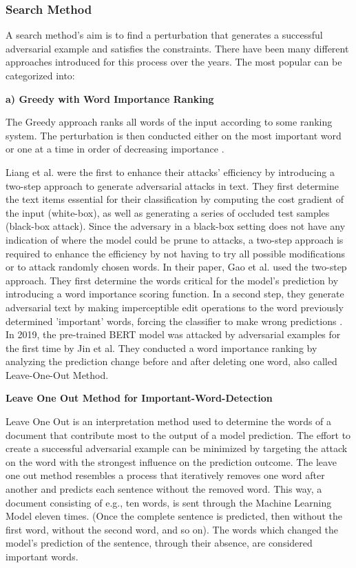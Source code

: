 \subsubsection{Search Method}
\label{sec:search_method}

A search method's aim is to find a perturbation that generates a successful adversarial example and satisfies the constraints. There have been many different approaches introduced for this process over the years. The most popular can be categorized into:

    \textbf{a) Greedy with Word Importance Ranking}
    
        The Greedy approach ranks all words of the input according to some ranking system. The perturbation is then conducted either on the most important word or one at a time in order of decreasing importance \cite{li2018textbugger, jin2019bert, garg2020bae}.
    
        Liang et al. were the first to enhance their attacks' efficiency by introducing a two-step approach to generate adversarial attacks in text. They first determine the text items essential for their classification by computing the cost gradient of the input (white-box), as well as generating a series of occluded test samples (black-box attack)\cite{liang2017deep}. 
        Since the adversary in a black-box setting does not have any indication of where the model could be prune to attacks, a two-step approach is required to enhance the efficiency by not having to try all possible modifications or to attack randomly chosen words. 
        In their paper, Gao et al. used the two-step approach. They first determine the words critical for the model's prediction by introducing a word importance scoring function. In a second step, they generate adversarial text by making imperceptible edit operations to the word previously determined 'important' words, forcing the classifier to make wrong predictions \cite{gao2018black}.
        In 2019, the pre-trained BERT model was attacked by adversarial examples for the first time by Jin et al. They conducted a word importance ranking by analyzing the prediction change before and after deleting one word, also called Leave-One-Out Method.  
        
        \textbf{Leave One Out Method for Important-Word-Detection}
        

        Leave One Out is an interpretation method used to determine the words of a document that contribute most to the output of a model prediction. The effort to create a successful adversarial example can be minimized by targeting the attack on the word with the strongest influence on the prediction outcome. The leave one out method resembles a process that iteratively removes one word after another and predicts each sentence without the removed word. 
        This way, a document consisting of e.g., ten words, is sent through the Machine Learning Model eleven times. (Once the complete sentence is predicted, then without the first word, without the second word, and so on). The words which changed the model's prediction of the sentence, through their absence, are considered important words. 
        
